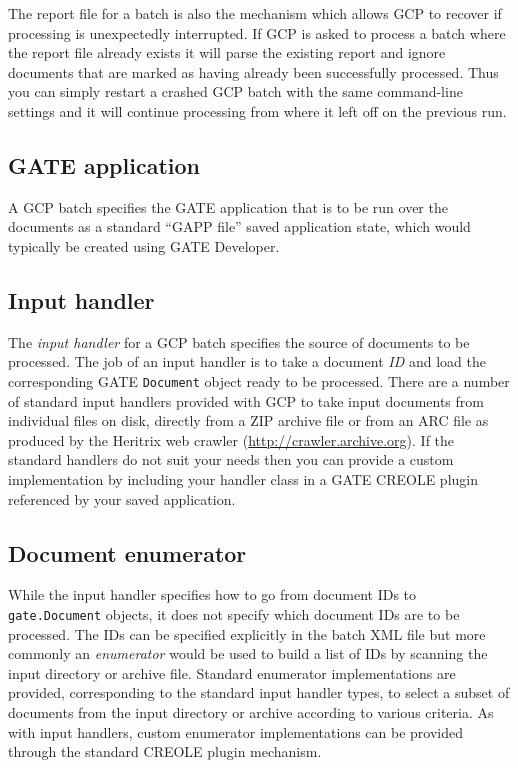 The report file for a batch is also the mechanism which allows GCP to recover
if processing is unexpectedly interrupted.  If GCP is asked to process a batch
where the report file already exists it will parse the existing report and
ignore documents that are marked as having already been successfully processed.
Thus you can simply restart a crashed GCP batch with the same command-line
settings and it will continue processing from where it left off on the previous
run.

\subsection*{GATE application}

A GCP batch specifies the GATE application that is to be run over the documents
as a standard ``GAPP file'' saved application state, which would typically be
created using GATE Developer.

\subsection*{Input handler}

The {\em input handler} for a GCP batch specifies the source of documents to be
processed.  The job of an input handler is to take a document {\em ID} and load
the corresponding GATE \verb!Document! object ready to be processed.  There are
a number of standard input handlers provided with GCP to take input documents
from individual files on disk, directly from a ZIP archive file or from an ARC
file as produced by the Heritrix web crawler
(\url{http://crawler.archive.org}).  If the standard handlers do not suit your
needs then you can provide a custom implementation by including your handler
class in a GATE CREOLE plugin referenced by your saved application.

\subsection*{Document enumerator}

While the input handler specifies how to go from document IDs to
\verb!gate.Document! objects, it does not specify which document IDs are to be
processed.  The IDs can be specified explicitly in the batch XML file but more
commonly an {\em enumerator} would be used to build a list of IDs by scanning
the input directory or archive file.  Standard enumerator implementations are
provided, corresponding to the standard input handler types, to select a subset
of documents from the input directory or archive according to various criteria.
As with input handlers, custom enumerator implementations can be provided
through the standard CREOLE plugin mechanism.

